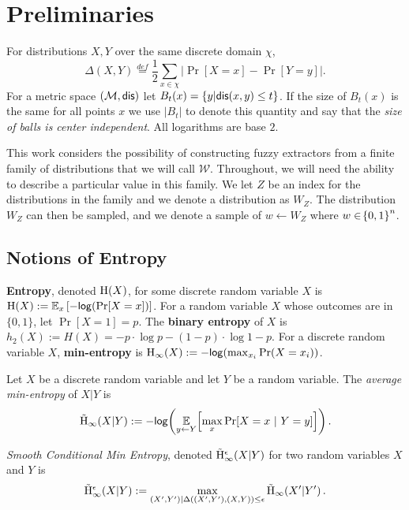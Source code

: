 
\section{Preliminaries}
\label{sec:prelim}
For distributions $X, Y$ over the same discrete domain $\chi$,
\[
\Delta(X, Y)\overset{def}= \frac{1}{2}\sum_{x \in \chi} \left| \Pr[X=x] - \Pr[Y=y]\right|.
\]
For a metric space $(\mathcal{M}, \mathsf{dis})$ let $B_t(x) = \{y | \mathsf{dis}(x, y)\le t\}$. If the size of $B_t(x)$ is the same for all points $x$ we use $|B_t|$ to denote this quantity and say that the \emph{size of balls is center independent}.  All logarithms are base $2$.

This work considers the possibility of constructing fuzzy extractors from a finite family of distributions that we will call $\mathcal{W}$. 
Throughout, we will need the ability to describe a particular value in this family.  
We let $Z$ be an index for the distributions in the family and we denote a distribution as $W_Z$. 
The distribution $W_Z$ can then be sampled, and we denote a sample of $w\leftarrow W_Z$ where  $w \in \!\left\{ 0,1 \right\}^{n}$.


\subsection{Notions of Entropy}
    \textbf{Entropy}, denoted $\mathrm{H}\!\left(X\right)$, for some discrete random variable $X$ is $\mathrm{H}\!\left(X\right) := \operatorname*{\mathbb{E}}_x\left[-\mathsf{log}\!\left(\Pr[X=x]\right)\right]$. 
    For a random variable $X$ whose outcomes are in $\{0,1\}$, let $\Pr[X=1] = p$. The \textbf{binary entropy} of $X$ is  $h_2(X) :=H(X)=-p\cdot\log{p} - (1-p)\cdot\log{1-p}.$ 
For a discrete random variable $X$, 
    \textbf{min-entropy} is $\mathrm{H}_{\infty}\!\left(X\right) := -\mathsf{log}\!\left(\max_{x_i} \Pr(X=x_i)\right)$.  
\begin{definition}
Let $X$ be a discrete random variable and let $Y$ be a random variable.  The \emph{average min-entropy} of $X|Y$ is  \[ \tilde{\mathrm{H}}_{\infty}\!\left(X|Y\right) := -\mathsf{log}\!\left(\operatorname*{\mathbb{E}}\limits_{y \leftarrow Y}\!\left[\max\limits_{x} \Pr\!\left[X = x\ |\ Y = y\right]\right]\right).\] 
\end{definition}

\begin{definition}
    \emph{Smooth Conditional Min Entropy}, denoted $\tilde{\mathrm{H}}_\infty^\epsilon(X|Y)$ for two random variables $X$ and $Y$ is \[\tilde{\mathrm{H}}_\infty^\epsilon(X|Y):=\max_{(X',Y') | \Delta((X', Y'), (X, Y))\le \epsilon} \tilde{\mathrm{H}}_{\infty}\!\left(X'|Y'\right).
    \] 
\end{definition}

